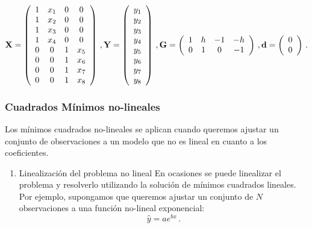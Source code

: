 \documentclass[
]{agujournal2019}
\providecommand{\tightlist}{%
  \setlength{\itemsep}{0pt}\setlength{\parskip}{0pt}}\usepackage{longtable,booktabs,array}
\begin{document}
\[{\textbf X}=\left(\begin{array}{cccccccc}
  1 & x_1  & 0 & 0 \\
  1 & x_2   & 0 & 0 \\
  1 & x_3   & 0 & 0\\
  1 & x_4   & 0 & 0 \\
  0 & 0  & 1 & x_5 \\
  0 & 0   & 1 & x_6 \\
  0 & 0   & 1 & x_7\\
  0 & 0   & 1 & x_8 \\
  \end{array}\right)\,,
{\textbf Y}=\left(\begin{array}{c}
    y_1 \\ y_2 \\ y_3 \\ y_4 \\ y_5\\ y_6\\y_7\\y_8
      \end{array}\right)\,,
{\textbf G}=\left(\begin{array}{cccccccc}
        1 & h & -1&-h\\
        0 & 1& 0&-1\\
          \end{array}\right)\,,
{\textbf d}=\left(\begin{array}{c}
            0\\
            0\\
              \end{array}\right)\,.
  \]

\vspace{0.5cm}

\hfill\break

\hypertarget{cuadrados-muxednimos-no-lineales}{%
\subsubsection{\texorpdfstring{Cuadrados Mínimos no-lineales\\
}{Cuadrados Mínimos no-lineales }}\label{cuadrados-muxednimos-no-lineales}}

\noindent Los mínimos cuadrados no-lineales se aplican cuando queremos
ajustar un conjunto de observaciones a un modelo que no es lineal en
cuanto a los coeficientes.

\vspace{0.5cm}

\begin{enumerate}
\def\labelenumi{\arabic{enumi}.}
\tightlist
\item
  Linealización del problema no lineal En ocasiones se puede linealizar
  el problema y resolverlo utilizando la solución de mínimos cuadrados
  lineales. Por ejemplo, supongamos que queremos ajustar un conjunto de
  \(N\) observaciones a una función no-lineal exponencial:
  \[\hat{y}=a e^{bx}\,.\]
\end{enumerate}
\end{document}
